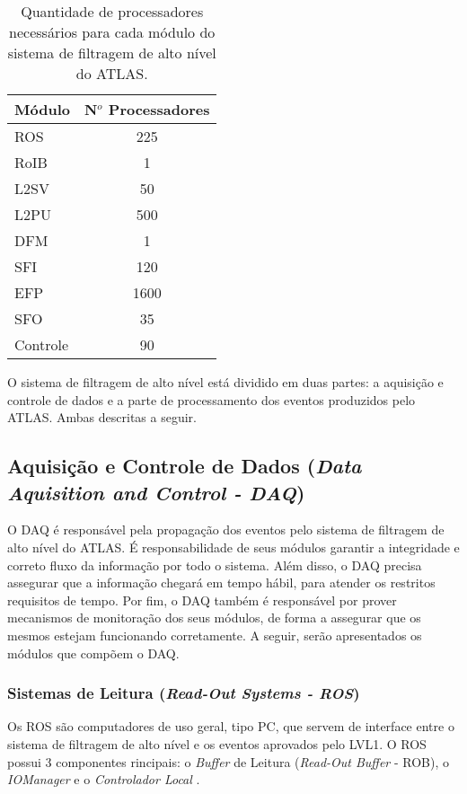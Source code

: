 \begin{table}
\begin{center}
\begin{tabular}{|l|c|}
\hline
Módulo & N$^o$ Processadores \\
\hline
ROS & 225 \\
\hline 
RoIB & 1 \\
\hline 
L2SV & 50 \\
\hline 
L2PU & 500 \\
\hline 
DFM & 1 \\
\hline 
SFI & 120 \\
\hline 
EFP & 1600 \\
\hline 
SFO & 35 \\
\hline 
Controle & 90 \\
\hline
\end{tabular}
\end{center}
\caption{Quantidade de processadores necessários para cada módulo do sistema de filtragem de alto nível do ATLAS.}
\label{tab:hlt_comp}
\end{table}

O sistema de filtragem de alto nível está dividido em duas partes: a aquisição e controle de dados e a parte de processamento dos eventos produzidos pelo ATLAS. Ambas descritas a seguir.

\subsection{Aquisição e Controle de Dados (\emph{Data Aquisition and Control - DAQ})}
\label{sec:daq} 

O DAQ é responsável pela propagação dos eventos pelo sistema de filtragem de alto nível do ATLAS. É responsabilidade de seus módulos garantir a integridade e correto fluxo da informação por todo o sistema. Além disso, o DAQ precisa assegurar que a informação chegará em tempo hábil, para atender os restritos requisitos de tempo. Por fim, o DAQ também é responsável por prover mecanismos de monitoração dos seus módulos, de forma a assegurar que os mesmos estejam funcionando corretamente. A seguir, serão apresentados os módulos que compõem o DAQ. 

\subsubsection{Sistemas de Leitura (\emph{Read-Out Systems - ROS})}
\label{sec:ros}

Os ROS são computadores de uso geral, tipo PC, que servem de interface entre o sistema de filtragem de alto nível e os eventos aprovados pelo LVL1. O ROS possui 3 componentes rincipais: o \emph{Buffer} de Leitura (\emph{Read-Out Buffer} - ROB), o \emph{IOManager} e o \emph{Controlador Local} .

